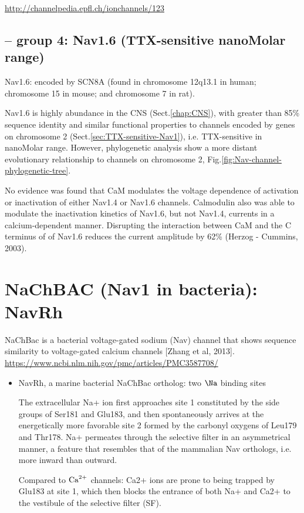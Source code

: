 \url{http://channelpedia.epfl.ch/ionchannels/123}

\subsection{-- group 4: Nav1.6 (TTX-sensitive nanoMolar range)}
\label{sec:TTX-sensitive-Nav1-group-4}

Nav1.6: encoded by SCN8A (found in chromosome 12q13.1 in human; chromosome 15
in mouse; and chromosome 7 in rat).

Nav1.6 is highly abundance in the CNS (Sect.\ref{chap:CNS}), with greater than
85\% sequence identity and similar functional properties to channels encoded by
genes on chromosome 2 (Sect.\ref{sec:TTX-sensitive-Nav1}), i.e. TTX-sensitive
in nanoMolar range. However, phylogenetic analysis show a more distant
evolutionary relationship to channels on chromosome 2,
Fig.\ref{fig:Nav-channel-phylogenetic-tree}.

No evidence was found that CaM modulates the voltage dependence of activation or
inactivation of either Nav1.4 or Nav1.6 channels.  Calmodulin also was able to
modulate the inactivation kinetics of Nav1.6, but not Nav1.4, currents in a
calcium-dependent manner.
Disrupting the interaction between CaM and the C terminus of of Nav1.6 reduces
the current amplitude by 62\% (Herzog - Cummins, 2003).




\section{NaChBAC (Nav1 in bacteria): NavRh}

NaChBac is a bacterial voltage-gated sodium (Nav) channel that shows sequence
similarity to voltage-gated calcium channels [Zhang et al, 2013]. 
\url{https://www.ncbi.nlm.nih.gov/pmc/articles/PMC3587708/}
\begin{itemize}
  \item  NavRh, a marine bacterial NaChBac ortholog: two $\Na$ binding sites
  
  The extracellular Na+ ion first approaches site 1 constituted by the side
  groups of Ser181 and Glu183, and then spontaneously arrives at the
  energetically more favorable site 2 formed by the carbonyl oxygens of Leu179
  and Thr178. Na+ permeates through the selective filter in an asymmetrical
  manner, a feature that resembles that of the mammalian Nav orthologs, i.e.
  more inward than outward.
  
  Compared to ${\text{Ca}^{2+}}$ channels: Ca2+ ions are prone to being trapped by Glu183 at
  site 1, which then blocks the entrance of both Na+ and Ca2+ to the vestibule
  of the selective filter (SF).
  
  
 
\end{itemize}


